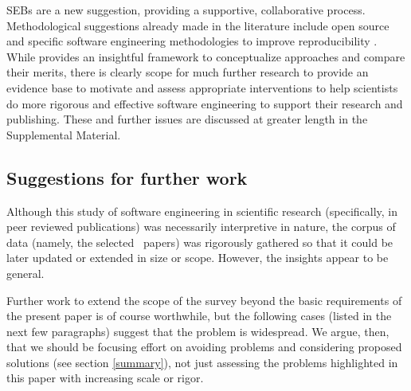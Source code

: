 \documentclass[10pt,letterpaper]{article}
\def\supplement{Supplemental Material}
\begin{document}
SEBs are a new suggestion, providing a supportive, collaborative process. Methodological suggestions already made in the literature include open source and specific software engineering methodologies to improve reproducibility \cite{basic-reproducibilty,open-source}. While \cite{ABCs-SE} provides an insightful framework to conceptualize approaches and compare their merits, there is clearly scope for much further research to provide an evidence base to motivate and assess appropriate interventions to help scientists do more rigorous and effective software engineering to support their research and publishing. These and further issues are discussed at greater length in the \supplement. 

\subsection{Suggestions for further work}

Although this study of software engineering in scientific research (specifically, in peer reviewed publications) was necessarily interpretive in nature, the corpus of data (namely, the selected \the\dataN\ papers) was rigorously gathered so that it could be later updated or extended in size or scope. However, the insights appear to be general.

Further work to extend the scope of the survey beyond the basic requirements of the present paper is of course worthwhile, but  the following cases (listed in the next few paragraphs) suggest that the problem is widespread. We argue, then, that we should be focusing effort on avoiding problems and considering proposed solutions (see section \ref{summary}), not just assessing the problems highlighted in this paper with increasing scale or rigor. 
\end{document}
